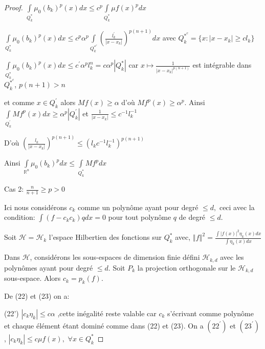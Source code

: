\documentclass[12pt, a4paper, oneside]{article}
\begin{document}
\begin{proof}
	$\int\limits_{Q_{k}^{\ast }}\mu _{0}(b_{k})^{p}(x)dx\leq
	c^{p}\int\limits_{Q_{k}^{\ast }}\mu f(x)^{p}dx$ 
	
	$\int\limits_{Q_{k}^{\ast }}\mu _{0}(b_{k})^{p}(x)dx\leq c^{p}\alpha
	^{p}\int\limits_{Q_{k}^{\ast ^{c}}}(\frac{l_{k}^{\prime }}{\left\vert
		x-x_{k}\right\vert })^{p(n+1)}dx$ avec $Q_{k}^{\ast ^{c}}=\{x:\left\vert
	x-x_{k}\right\vert \geq cl_{k}\}$
	
	$\int\limits_{Q_{k}^{\ast }}\mu _{0}(b_{k})^{p}(x)dx\leq c^{\prime
	}\alpha ^{p}l_{k}^{n}=c\alpha ^{p}\left\vert Q_{k}^{\ast }\right\vert $ car $
	x\longmapsto \frac{1}{\left\vert x-x_{k}\right\vert ^{p(n+1)}}$ est intégrable dans $Q_{k}^{\ast ^{c}}$, $p(n+1)>n$
	
	et comme $x\in Q_{k}^{\prime }$ alors $Mf(x)\geq \alpha $ d'où $
	Mf^{p}(x)\geq \alpha ^{p}.$ Ainsi $\int\limits_{Q_{k}^{\prime
	}}Mf^{p}(x)dx\geq \alpha ^{p}\left\vert Q_{k}^{\prime }\right\vert $ et $
	\frac{1}{\left\vert x-x_{k}\right\vert }\leq c^{-1}l_{k}^{-1}$
	
	D'où $(\frac{l_{k}}{\left\vert x-x_{k}\right\vert })^{p(n+1)}\leq
	(l_{k}c^{-1}l_{k}^{-1})^{p(n+1)}$
	
	Ainsi $\int\limits_{\mathbb{R}^{n}}\mu _{0}(b_{k})^{p}dx\leq \int\limits_{Q_{k}^{\ast }}Mf^{p}dx$
	
	Cas 2: $\frac{n}{n+1}\geq p>0$
	
	Ici nous considérons $c_{k}$ comme un polynôme ayant pour degré $\leq d,$ ceci avec la condition: $\int (f-c_{k}c_{k})qdx=0$ pour
	tout polynôme $q$ de degré $\leq d.$
	
	Soit $\mathcal{H} =\mathcal{H} _{k}$ l'espace Hilbertien des fonctions sur $Q_{k}^{\ast }$ avec, $
	\left\Vert f\right\Vert ^{2}=\frac{\int \left\vert f(x)\right\vert ^{2}\eta
		_{k}(x)dx}{\int \eta _{k}(x)dx}$
	
	Dans $\mathcal{H}$, considérons les sous-espaces de dimension finie défini $
	\mathcal{H}_{k,d}$ avec les polynômes ayant pour degré $\leq d.$ Soit $
	P_{k}$ la projection orthogonale sur le $\mathcal{H}_{k,d}$ sous-espace. Alors $
	c_{k}=p_{k}(f).$
	
	De (22) et (23) on a:
	
	(22') $\left\vert c_{k}\eta _{k}\right\vert \leq c\alpha $ ,cette inégalité reste valable car $c_{k}$ s'écrivant comme polynôme et
	chaque élément étant dominé comme dans (22) et (23). On a $
	(22^{\prime })$ et $(23^{\prime })$ , $\left\vert c_{k}\eta _{k}\right\vert
	\leq c\mu f(x),$ $\forall x\in Q_{k}^{\ast }$
	

\end{proof}
\end{document}
